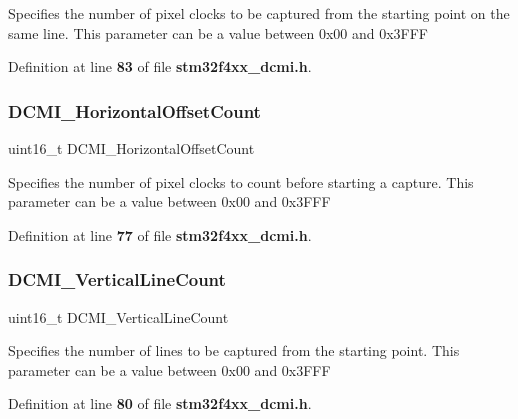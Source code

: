 Specifies the number of pixel clocks to be captured from the starting point on the same line. This parameter can be a value between 0x00 and 0x3\+F\+FF 

Definition at line \textbf{ 83} of file \textbf{ stm32f4xx\+\_\+dcmi.\+h}.

\mbox{\label{structDCMI__CROPInitTypeDef_ae0b5043fbbed94113c749e24c150b542}} 
\subsubsection{D\+C\+M\+I\+\_\+\+Horizontal\+Offset\+Count}
{\footnotesize\ttfamily uint16\+\_\+t D\+C\+M\+I\+\_\+\+Horizontal\+Offset\+Count}

Specifies the number of pixel clocks to count before starting a capture. This parameter can be a value between 0x00 and 0x3\+F\+FF 

Definition at line \textbf{ 77} of file \textbf{ stm32f4xx\+\_\+dcmi.\+h}.

\mbox{\label{structDCMI__CROPInitTypeDef_a43586118e74eb0f625d56dad90fd381e}} 
\subsubsection{D\+C\+M\+I\+\_\+\+Vertical\+Line\+Count}
{\footnotesize\ttfamily uint16\+\_\+t D\+C\+M\+I\+\_\+\+Vertical\+Line\+Count}

Specifies the number of lines to be captured from the starting point. This parameter can be a value between 0x00 and 0x3\+F\+FF 

Definition at line \textbf{ 80} of file \textbf{ stm32f4xx\+\_\+dcmi.\+h}.

\mbox{\label{structDCMI__CROPInitTypeDef_af535547df102beb7e1435eb24cd2e262}} 
